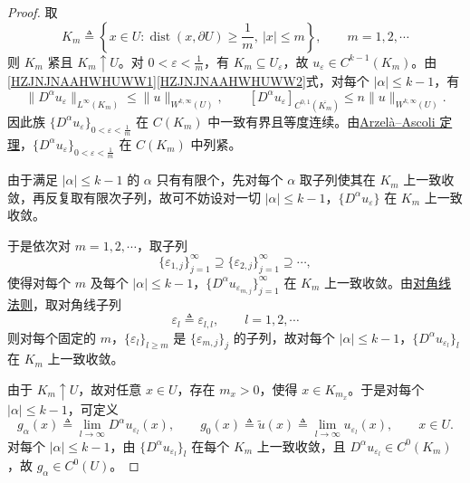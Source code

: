 \documentclass[../../main.tex]{subfiles}
\begin{document}
\begin{proof}
取
\[
K_m
\triangleq
\left\{
x\in U:
\operatorname{dist}(x,\partial U)\geqslant\frac1m,\ 
|x|\leqslant m
\right\},
\qquad
m=1,2,\cdots
\]
则 \(K_m\) 紧且 \(K_m\uparrow U\)。对 \(0<\varepsilon<\frac{1}{m}\)，有 \(K_m\subseteq U_\varepsilon\)，故 \(u_\varepsilon\in C^{k-1}(K_m)\)。由\eqref{HZJNJNAAHWHUWW1}\eqref{HZJNJNAAHWHUWW2}式，对每个 \(|\alpha|\leqslant k-1\)，有
\[
\|D^\alpha u_\varepsilon\|_{L^\infty(K_m)}
\leqslant
\|u\|_{W^{k,\infty}(U)},
\qquad
\left[ D^{\alpha}u_{\varepsilon} \right] _{C^{0,1}(\overline{K_m})}
\leqslant
n\|u\|_{W^{k,\infty}(U)}.
\]
因此族 \(\{D^\alpha u_\varepsilon\}_{0<\varepsilon<\frac{1}{m}}\) 在 \(C(K_m)\) 中一致有界且等度连续。由\hyperref[Functional Analysis-theorem:泛函分析--Arzelà-Ascoli定理]{Arzelà--Ascoli 定理}，\(\{D^\alpha u_\varepsilon\}_{0<\varepsilon<\frac{1}{m}}\) 在 \(C(K_m)\) 中列紧。

由于满足 \(|\alpha|\leqslant k-1\) 的 \(\alpha\) 只有有限个，先对每个 \(\alpha\) 取子列使其在 \(K_m\) 上一致收敛，再反复取有限次子列，故可不妨设对一切 \(|\alpha|\leqslant k-1\)，\(\{D^\alpha u_\varepsilon\}\) 在 \(K_m\) 上一致收敛。

于是依次对 \(m=1,2,\cdots\)，取子列
\[
\{\varepsilon_{1,j}\}_{j=1}^\infty
\supseteq
\{\varepsilon_{2,j}\}_{j=1}^\infty
\supseteq\cdots,
\]
使得对每个 \(m\) 及每个 \(|\alpha|\leqslant k-1\)，\(\{D^\alpha u_{\varepsilon_{m,j}}\}_{j=1}^\infty\) 在 \(K_m\) 上一致收敛。由\hyperref[Functional Analysis-proposition:对角线法则]{对角线法则}，取对角线子列
\[
\varepsilon_l\triangleq\varepsilon_{l,l},
\qquad
l=1,2,\cdots
\]
则对每个固定的 \(m\)，\(\{\varepsilon_l\}_{l\geqslant m}\) 是 \(\{\varepsilon_{m,j}\}_j\) 的子列，故对每个 \(|\alpha|\leqslant k-1\)，\(\{D^\alpha u_{\varepsilon_l}\}_l\) 在 \(K_m\) 上一致收敛。

由于 \(K_m\uparrow U\)，故对任意 \(x\in U\)，存在 \(m_x>0\)，使得 \(x\in K_{m_x}\)。于是对每个 \(|\alpha|\leqslant k-1\)，可定义
\[
g_\alpha(x)\triangleq\lim_{l\to\infty}D^\alpha u_{\varepsilon_l}(x),
\qquad
g_0(x)\triangleq\widetilde u(x)\triangleq\lim_{l\to\infty}u_{\varepsilon_l}(x),
\qquad
x\in U.
\]
对每个 \(|\alpha|\leqslant k-1\)，由 \(\{D^\alpha u_{\varepsilon_l}\}_l\) 在每个 \(K_m\) 上一致收敛，且 \(D^\alpha u_{\varepsilon_l}\in C^0(K_m)\)，故 \(g_\alpha\in C^0(U)\)。


\end{proof}
\end{document}
